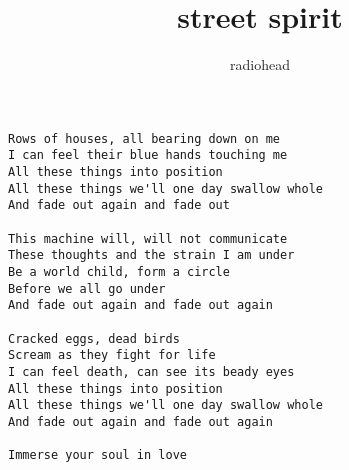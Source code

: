 \author{radiohead}
\title{street spirit}
\maketitle
\begin{verbatim}
Rows of houses, all bearing down on me
I can feel their blue hands touching me
All these things into position
All these things we'll one day swallow whole
And fade out again and fade out

This machine will, will not communicate
These thoughts and the strain I am under
Be a world child, form a circle
Before we all go under
And fade out again and fade out again

Cracked eggs, dead birds
Scream as they fight for life
I can feel death, can see its beady eyes
All these things into position
All these things we'll one day swallow whole
And fade out again and fade out again

Immerse your soul in love
\end{verbatim}